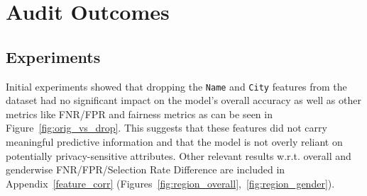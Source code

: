\chapter{Audit Outcomes}






\section{Experiments}
Initial experiments showed that dropping the \texttt{Name} and \texttt{City} features from the dataset had no significant impact on the model’s overall accuracy as well as other metrics like FNR/FPR and fairness metrics as can be seen in Figure~\ref{fig:orig_vs_drop}. This suggests that these features did not carry meaningful predictive information and that the model is not overly reliant on potentially privacy-sensitive attributes. Other relevant results w.r.t. overall and genderwise FNR/FPR/Selection Rate Difference are included in Appendix~\ref{feature_corr} (Figures~\ref{fig:region_overall},~\ref{fig:region_gender}). 

